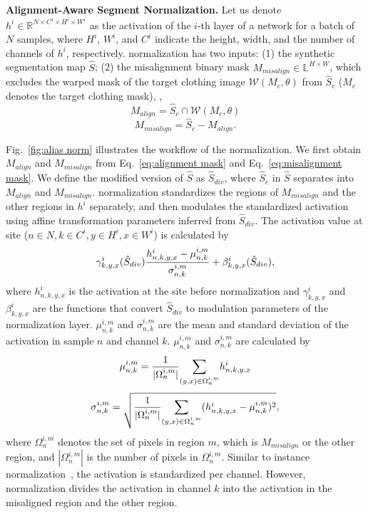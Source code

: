 \textbf{Alignment-Aware Segment Normalization.}
Let us denote $h^i \in \mathbb{R}^{N \times C^i \times H^i \times W^i}$ as the activation of the $i$-th layer of a network for a batch of $N$ samples, where $H^i$, $W^i$, and $C^i$ indicate the height, width, and the number of channels of $h^i$, respectively. 
\norm normalization has two inputs:
(1) the synthetic segmentation map $\hat{S}$;
(2) the misalignment binary mask $M_{misalign} \in \mathbb{L}^{H \times W}$, which excludes the warped mask of the target clothing image $\mathcal{W}(M_c, \theta)$ from $\hat{S}_c$ ($M_c$ denotes the target clothing mask), \ie,
\begin{equation}
    M_{align} = \hat{S}_c \cap \mathcal{W}(M_c, \theta)
    \label{eq:alignment mask}
\end{equation}
\begin{equation}
    M_{misalign} = \hat{S}_c - M_{align}.
    \label{eq:misalignment mask}
\end{equation}

Fig.~\ref{fig:alias norm} illustrates the workflow of the \norm normalization.
We first obtain $M_{align}$ and $M_{misalign}$ from Eq.~\eqref{eq:alignment mask} and Eq.~\eqref{eq:misalignment mask}.
We define the modified version of $\hat{S}$ as $\hat{S}_{div}$, where $\hat{S}_c$ in $\hat{S}$ separates into $M_{align}$ and $M_{misalign}$.
\norm normalization standardizes the regions of $M_{misalign}$ and the other regions in $h^i$ separately, and then modulates the standardized activation using affine transformation parameters inferred from $\hat{S}_{div}$.
The activation value at site ($n \in N, k \in C^i, y \in H^i, x \in W^i$) is calculated by
\begin{equation}
    \gamma^i_{k,y,x}(\hat{S}_{div})
    {{h^i_{n,k,y,x} - \mu^{i,m}_{n,k}} \over \sigma^{i,m}_{n,k}}
    + \beta^i_{k,y,x}(\hat{S}_{div}), 
\end{equation}
where $h^i_{n,k,y,x}$ is the activation at the site before normalization and $\gamma^i_{k,y,x}$ and $\beta^i_{k,y,x}$ are the functions that convert $\hat{S}_{div}$ to modulation parameters of the normalization layer.
$\mu^{i,m}_{n,k}$ and $\sigma^{i,m}_{n,k}$ are the mean and standard deviation of the activation in sample $n$ and channel $k$.
$\mu^{i,m}_{n,k}$ and $\sigma^{i,m}_{n,k}$ are calculated by
\begin{equation}
    \mu^{i,m}_{n,k} = {1 \over |\Omega^{i,m}_n|}
    {\sum \limits_{(y,x) \in \Omega^{i,m}_n}} h^i_{n,k,y,x}
\end{equation}
\begin{equation}
    \sigma^{i,m}_{n,k} = \sqrt{
        {1 \over |\Omega^{i,m}_n|}
        {\sum \limits_{(y,x) \in \Omega^{i,m}_n}} (h^i_{n,k,y,x} - \mu^{i,m}_{n,k})^2
    }, 
\end{equation}
where $\Omega^{i,m}_n$ denotes the set of pixels in region $m$, which is $M_{misalign}$ or the other region, and $|\Omega^{i,m}_n|$ is the number of pixels in $\Omega^{i,m}_n$.
Similar to instance normalization~\cite{ulyanov2016instance}, the activation is standardized per channel.
However, \norm normalization divides the activation in channel $k$ into the activation in the misaligned region and the other region.

